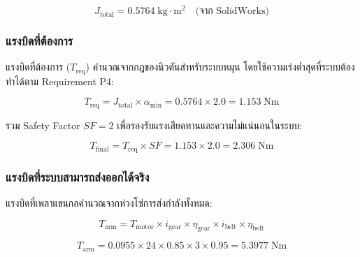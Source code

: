 \begin{equation}
  J_{\mathrm{total}} = 0.5764 \; \mathrm{kg \cdot m^2}
  \quad \text{(จาก SolidWorks)}
  \label{eq:jtotal}
\end{equation}

\subsubsection{แรงบิดที่ต้องการ}

แรงบิดที่ต้องการ ($T_{\mathrm{req}}$) คำนวณจากกฎของนิวตันสำหรับระบบหมุน
โดยใช้ความเร่งต่ำสุดที่ระบบต้องทำได้ตาม Requirement P4:

\begin{equation}
  T_{\mathrm{req}} = J_{\mathrm{total}} \times \alpha_{\min}
  = 0.5764 \times 2.0
  = 1.153 \; \mathrm{Nm}
  \label{eq:treq}
\end{equation}

รวม Safety Factor $SF = 2$ เพื่อรองรับแรงเสียดทานและความไม่แน่นอนในระบบ:

\begin{equation}
  T_{\mathrm{final}} = T_{\mathrm{req}} \times SF
  = 1.153 \times 2.0
  = 2.306 \; \mathrm{Nm}
  \label{eq:tfinal}
\end{equation}

\subsubsection{แรงบิดที่ระบบสามารถส่งออกได้จริง}

แรงบิดที่เพลาแขนกลคำนวณจากห่วงโซ่การส่งกำลังทั้งหมด:

\begin{equation}
  T_{\mathrm{arm}} = T_{\mathrm{motor}} \times i_{\mathrm{gear}} \times \eta_{\mathrm{gear}}
                   \times i_{\mathrm{belt}} \times \eta_{\mathrm{belt}}
  \label{eq:tarm_chain}
\end{equation}

\begin{equation}
  T_{\mathrm{arm}} = 0.0955 \times 24 \times 0.85 \times 3 \times 0.95
  = 5.3977 \; \mathrm{Nm}
  \label{eq:tarm}
\end{equation}

